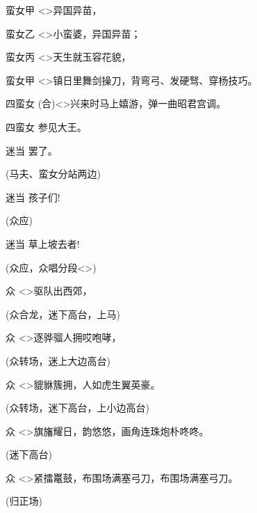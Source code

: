 {蛮女甲\hspace{20pt} \textless{}\!\textgreater{}异国异苗，

蛮女乙\hspace{20pt} \textless{}\!\textgreater{}小蛮婆，异国异苗；

蛮女丙\hspace{20pt} \textless{}\!\textgreater{}天生就玉容花貌，

蛮女甲\hspace{20pt} \textless{}\!\textgreater{}镇日里舞剑操刀，背弯弓、发硬驽、穿杨技巧。

四蛮女\hspace{20pt} ({\akai 合})\textless{}\!\textgreater{}兴来时马上嬉游，弹一曲昭君宫调。

四蛮女\hspace{20pt} 参见大王。

迷当\hspace{30pt} 罢了。

(马夫、蛮女{\hwfs 分站两边})

迷当\hspace{30pt} 孩子们!

(众{\hwfs 应})

迷当\hspace{30pt} 草上坡去者!

(众{\hwfs 应}，众{\hwfs 唱分段}\textless{}\!\textgreater{})

众\hspace{40pt} \textless{}\!\textgreater{}驱队出西郊，

(众{\hwfs 合龙}，迷{\hwfs 下高台}，{\hwfs 上马})

众\hspace{40pt} \textless{}\!\textgreater{}逐骅骝人拥哎咆哮，

(众{\hwfs 转场}，迷{\hwfs 上大边高台})

众\hspace{40pt} \textless{}\!\textgreater{}貔貅簇拥，人如虎生翼英豪。

(众{\hwfs 转场}，迷{\hwfs 下高台}，{\hwfs 上小边高台})

众\hspace{40pt} \textless{}\!\textgreater{}旗旛耀日，韵悠悠，画角连珠炮朴咚咚。

(迷{\hwfs 下高台})

众\hspace{40pt} \textless{}\!\textgreater{}紧擂鼍鼓，布围场满塞弓刀，布围场满塞弓刀。

({\hwfs 归正场})
}
